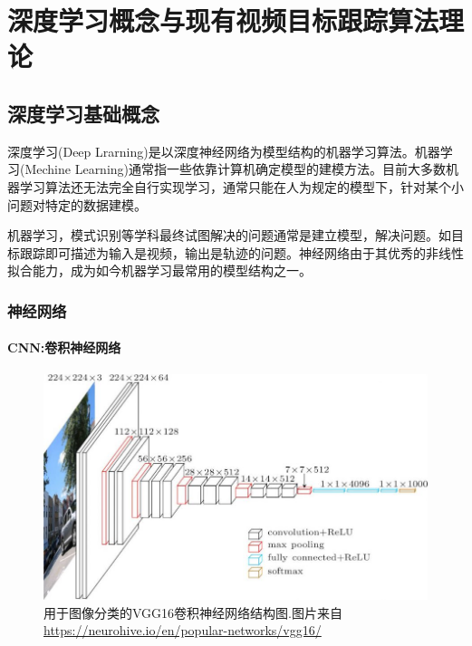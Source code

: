 \chapter{深度学习概念与现有视频目标跟踪算法理论}
\section{深度学习基础概念}
深度学习(Deep Lrarning)是以深度神经网络为模型结构的机器学习算法\supercite{deng2014deep}。机器学习(Mechine Learning)通常指一些依靠计算机确定模型的建模方法。目前大多数机器学习算法还无法完全自行实现学习，通常只能在人为规定的模型下，针对某个小问题对特定的数据建模。
\par
机器学习，模式识别等学科最终试图解决的问题通常是建立模型，解决问题。如目标跟踪即可描述为输入是视频，输出是轨迹的问题。神经网络由于其优秀的非线性拟合能力，成为如今机器学习最常用的模型结构之一。
\subsection{神经网络}

\subsubsection{CNN:卷积神经网络}


\par
\begin{figure}[htbp!]
    \centering
    \includegraphics[width = 1.\textwidth]{chap/img/vgg16-neural-network.jpg}
    \caption{
        用于图像分类的VGG16\supercite{simonyan2014very}卷积神经网络结构图.图片来自 \url{https://neurohive.io/en/popular-networks/vgg16/}
        }\label{fig:vgg16_architecture}
\end{figure}
\par


